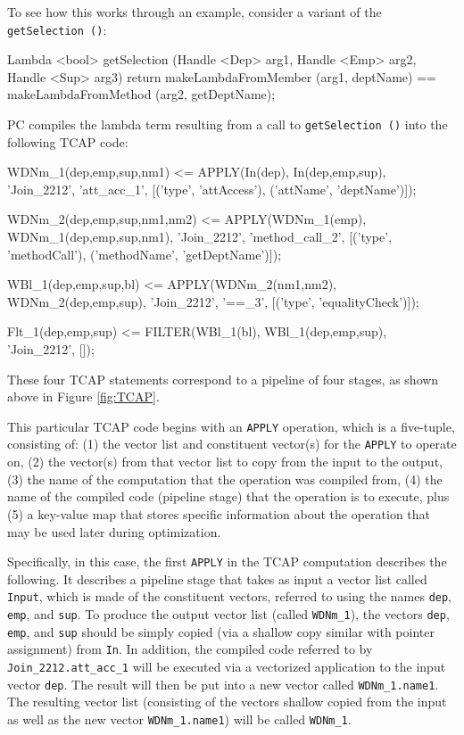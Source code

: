 To see how this works through an example, consider a variant of the \texttt{getSelection ()}:

\begin{codesmall} 
Lambda <bool> getSelection (Handle <Dep> arg1, 
     Handle <Emp> arg2, Handle <Sup> arg3) {
	return makeLambdaFromMember (arg1, deptName) == 
	       makeLambdaFromMethod (arg2, getDeptName);  }
\end{codesmall}

\noindent PC compiles the lambda term resulting from a call to \texttt{getSelection ()} into the following TCAP code:

\begin{codesmall}
WDNm_1(dep,emp,sup,nm1) <= APPLY(In(dep), 
   In(dep,emp,sup), 'Join_2212', 'att_acc_1', 
      [('type', 'attAccess'), ('attName', 'deptName')]);

WDNm_2(dep,emp,sup,nm1,nm2) <= APPLY(WDNm_1(emp), 
   WDNm_1(dep,emp,sup,nm1), 'Join_2212',
      'method_call_2', [('type', 'methodCall'), 
          ('methodName', 'getDeptName')]);

WBl_1(dep,emp,sup,bl) <= APPLY(WDNm_2(nm1,nm2),
   WDNm_2(dep,emp,sup), 'Join_2212', '==_3', 
      [('type', 'equalityCheck')]);

Flt_1(dep,emp,sup) <= FILTER(WBl_1(bl), 
   WBl_1(dep,emp,sup), 'Join_2212', []);
\end{codesmall}

\noindent
These four TCAP statements correspond to a pipeline of four stages,
as shown above in Figure \ref{fig:TCAP}.

This particular TCAP code begins with an \texttt{APPLY} operation, which is a five-tuple, consisting of: (1) the vector list and constituent
vector(s) for the \texttt{APPLY} to operate on, (2) the vector(s) from that vector list to copy
from the input to the output, (3) the name of the computation that the operation was compiled from, (4) the name of the compiled code (pipeline stage)
that the operation is to execute, plus (5) a key-value map that stores specific information about the operation that may be used 
later during optimization.

Specifically, in this case, the first \texttt{APPLY} in the TCAP computation describes the following.  It describes a pipeline stage that
takes as input 
a vector list called \texttt{Input}, which is made of the constituent vectors, referred to using 
the names \texttt{dep}, \texttt{emp}, and \texttt{sup}.
To produce the output vector list (called \texttt{WDNm\_1}), the vectors
\texttt{dep}, \texttt{emp}, and \texttt{sup} should be simply copied
(via a shallow copy similar with pointer assignment) from \texttt{In}.
In addition, the compiled code referred to by \texttt{Join\_2212.att\_acc\_1} will be executed via a vectorized application to the input
vector \texttt{dep}.  The result will then be put into a new vector called 
\texttt{WDNm\_1.name1}.
The resulting vector list (consisting of the vectors shallow copied from the input as well as the new vector \texttt{WDNm\_1.name1})
will be called \texttt{WDNm\_1}.  

